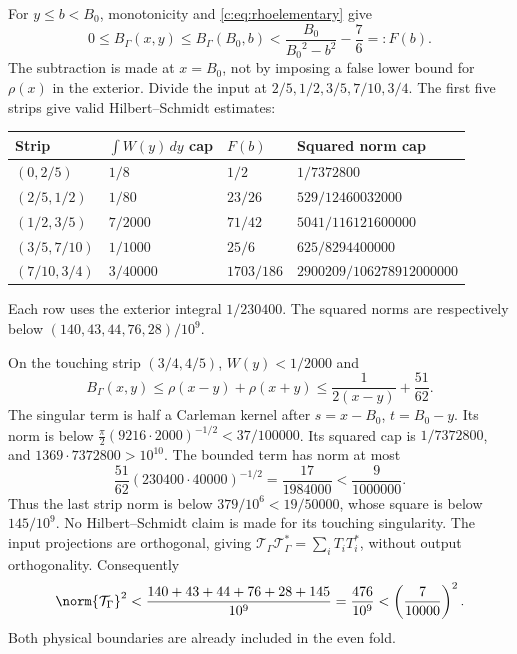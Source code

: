 \documentclass[11pt,a4paper]{article}
\numberwithin{equation}{section}
\theoremstyle{definition}\newtheorem{definition}[theorem]{Definition}
\theoremstyle{remark}\newtheorem{remark}[theorem]{Remark}
\begin{document}
For $y\le b<{B_0}$, monotonicity and \eqref{c:eq:rhoelementary} give
\[
 0\le B_\Gamma(x,y)\le B_\Gamma({B_0},b)
 <\frac{{B_0}}{{B_0}^2-b^2}-\frac76=:F(b).
\]
The subtraction is made at $x={B_0}$, not by imposing a false lower bound for $\rho(x)$ in the exterior.
Divide the input at $2/5,1/2,3/5,7/10,3/4$.
The first five strips give valid Hilbert--Schmidt estimates:
\begin{center}\small
\begin{tabular}{@{}llll@{}}\toprule
Strip & $\int W(y)\,dy$ cap & $F(b)$ & Squared norm cap\\\midrule
$(0,2/5)$ & $1/8$ & $1/2$ & $1/7372800$\\
$(2/5,1/2)$ & $1/80$ & $23/26$ & $529/12460032000$\\
$(1/2,3/5)$ & $7/2000$ & $71/42$ & $5041/116121600000$\\
$(3/5,7/10)$ & $1/1000$ & $25/6$ & $625/8294400000$\\
$(7/10,3/4)$ & $3/40000$ & $1703/186$ & $2900209/106278912000000$\\\bottomrule
\end{tabular}
\end{center}
Each row uses the exterior integral $1/230400$.
The squared norms are respectively below $(140,43,44,76,28)/10^9$.

On the touching strip $(3/4,4/5)$, $W(y)<1/2000$ and
\[
 B_\Gamma(x,y)\le\rho(x-y)+\rho(x+y)
 \le\frac1{2(x-y)}+\frac{51}{62}.
\]
The singular term is half a Carleman kernel after $s=x-{B_0}$, $t={B_0}-y$.
Its norm is below
$\frac\pi2(9216\cdot2000)^{-1/2}<37/100000$.
Its squared cap is $1/7372800$, and $1369\cdot7372800>10^{10}$.
The bounded term has norm at most
\[
 \frac{51}{62}(230400\cdot40000)^{-1/2}
 =\frac{17}{1984000}<\frac9{1000000}.
\]
Thus the last strip norm is below $379/10^6<19/50000$, whose square is below $145/10^9$.
No Hilbert--Schmidt claim is made for its touching singularity.
The input projections are orthogonal, giving
$\mathcal T_\Gamma \mathcal T_\Gamma^*=\sum_iT_iT_i^*$, without output orthogonality.
Consequently
\begin{equation}\label{c:eq:gammaremainnorm}
 \norm{\mathcal T_\Gamma}^2<\frac{140+43+44+76+28+145}{10^9}
 =\frac{476}{10^9}<\left(\frac7{10000}\right)^2.
\end{equation}
Both physical boundaries are already included in the even fold.
\end{document}
